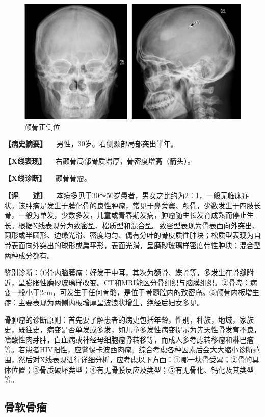 \begin{figure}[!htbp]
 \centering
 \includegraphics{./images/Image00086.jpg}
 \captionsetup{justification=centering}
 \caption{颅骨正侧位}
 \label{fig2-7-1}
  \end{figure} 

\textbf{【病史摘要】} 　男性，30岁。右侧颞部局部突出半年。

\textbf{【X线表现】} 　右颞骨局部骨质增厚，骨密度增高（箭头）。

\textbf{【X线诊断】} 　颞骨骨瘤。

\textbf{【评　　述】}
　本病多见于30～50岁患者，男女之比约为2∶1，一般无临床症状。该肿瘤是发生于膜化骨的良性肿瘤，常见于鼻旁窦、颅骨，少数发生于四肢长骨，一般为单发，少数多发，儿童或青春期发病，肿瘤随生长发育成熟而停止生长。根据X线表现分为致密型、松质型和混合型。致密型表现为骨表面向外突出、圆形或半圆形、边缘光滑、密度均匀、偶有分叶的骨皮质性肿块；松质型表现为自骨表面向外突出的球形或扁平形，表面光滑，呈磨砂玻璃样密度骨性肿块；混合型两种成分都有。

鉴别诊断：①骨内脑膜瘤：好发于中耳，其次为额骨、蝶骨等，多发生在骨缝附近，呈膨胀性磨砂玻璃样改变。CT和MRI能区分骨组织与脑膜组织。②骨岛：病变一般小于2cm，可发生于任何骨骼，是位于骨髓腔内的致密岛。③颅骨内板增生症：主要表现为两侧内板增厚呈波浪状增生，绝经后妇女多见。

骨肿瘤的诊断原则：首先要了解患者的病史包括年龄，性别，种族，地域，家族史，既往史，病变是否单发或多发，如儿童多发性病变提示为先天性骨发育不良，嗜酸性肉芽肿，白血病或神经母细胞瘤骨转移等，而成人多考虑转移瘤和淋巴瘤等。若患者HIV阳性，应警惕卡波西肉瘤。综合考虑各种因素后会大大缩小诊断范围，然后对X线表现进行详细分析，应考虑以下方面：①哪一块骨受累；②骨的具体位置；③骨质破坏类型；④有无骨膜反应及类型；⑤有无骨化、钙化及其类型等。

\subsection{骨软骨瘤}


